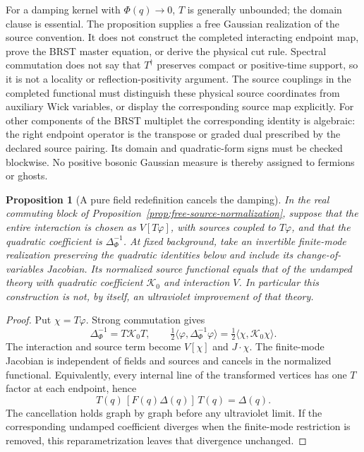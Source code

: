 \documentclass[final,5p,times,twocolumn,numbers,nopreprintline]{elsarticle}
\numberwithin{equation}{section}
\newtheorem{proposition}[theorem]{Proposition}
\theoremstyle{definition}
\theoremstyle{remark}
\newcommand{\Ph}{\Phi}
\begin{document}
For a damping kernel with \(\Ph(q)\to0\), \(T\) is generally
unbounded; the domain clause is essential. The proposition supplies
a free Gaussian realization of the source convention. It does not
construct the completed interacting endpoint map, prove the BRST
master equation, or derive the physical cut rule. Spectral commutation
does not say that \(T^\dagger\) preserves compact or positive-time
support, so it is not a locality or reflection-positivity argument. The source couplings
in the completed functional must distinguish these physical source
coordinates from auxiliary Wick variables, or display the corresponding
source map explicitly. For other components of the BRST multiplet the corresponding identity
is algebraic: the right endpoint operator is the transpose or graded
dual prescribed by the declared source pairing. Its domain and
quadratic-form signs must be checked blockwise. No positive bosonic
Gaussian measure is thereby assigned to fermions or ghosts.

\begin{proposition}[A pure field redefinition cancels the damping]
\label{prop:pure-redefinition-cancellation}
In the real commuting block of
Proposition~\ref{prop:free-source-normalization}, suppose that the
entire interaction is chosen as \(V[T\varphi]\), with sources
coupled to \(T\varphi\), and that the quadratic coefficient is
\(\Delta_\Ph^{-1}\). At fixed background, take an invertible
finite-mode realization preserving the quadratic identities below
and include its change-of-variables Jacobian. Its normalized source
functional equals that of the undamped theory with quadratic
coefficient \(\mathscr K_0\) and interaction \(V\).
In particular this construction is not, by itself, an ultraviolet
improvement of that theory.
\end{proposition}

\begin{proof}
Put \(\chi=T\varphi\). Strong commutation gives
\[
 \Delta_\Ph^{-1}=T\mathscr K_0T,
 \qquad
 \tfrac12\langle\varphi,\Delta_\Ph^{-1}\varphi\rangle
   =\tfrac12\langle\chi,\mathscr K_0\chi\rangle.
\]
The interaction and source term become \(V[\chi]\) and
\(J\cdot\chi\). The finite-mode Jacobian is independent of
fields and sources and cancels in the normalized functional.
Equivalently, every internal line of the transformed vertices has
one \(T\) factor at each endpoint, hence
\begin{equation}
 T(q)\,[F(q)\Delta(q)]\,T(q)=\Delta(q).
 \label{eq:internal-damping-cancellation}
\end{equation}
The cancellation holds graph by graph before any ultraviolet limit.
If the corresponding undamped coefficient diverges when the
finite-mode restriction is removed, this reparametrization leaves
that divergence unchanged.
\end{proof}
\end{document}
